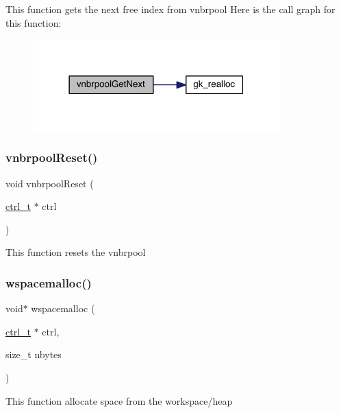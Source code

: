 This function gets the next free index from vnbrpool Here is the call graph for this function\+:\nopagebreak
\begin{figure}[H]
\begin{center}
\leavevmode
\includegraphics[width=270pt]{a00945_a371b41152c6e40d6866b357a4ffee5f1_cgraph}
\end{center}
\end{figure}
\mbox{\label{a00945_a0eac0ea6853b8ee210cbd739e17782aa}} 
\subsubsection{\texorpdfstring{vnbrpool\+Reset()}{vnbrpoolReset()}}
{\footnotesize\ttfamily void vnbrpool\+Reset (\begin{DoxyParamCaption}\item[{\hyperlink{a00742}{ctrl\+\_\+t} $\ast$}]{ctrl }\end{DoxyParamCaption})}

This function resets the vnbrpool \mbox{\label{a00945_a555f2ae3f4e5561c9b1ef592bf0f8476}} 
\subsubsection{\texorpdfstring{wspacemalloc()}{wspacemalloc()}}
{\footnotesize\ttfamily void$\ast$ wspacemalloc (\begin{DoxyParamCaption}\item[{\hyperlink{a00742}{ctrl\+\_\+t} $\ast$}]{ctrl,  }\item[{size\+\_\+t}]{nbytes }\end{DoxyParamCaption})}

This function allocate space from the workspace/heap \mbox{\label{a00945_ad26c08175b8b18d7dfb86f2f8d91b09e}} 
